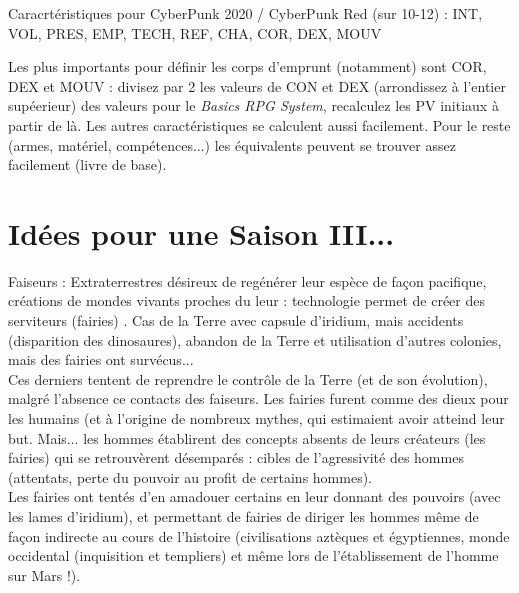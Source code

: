 \documentclass[11pt,twoside,a4paper]{book}
\begin{document}
Caracrt{\'e}ristiques pour CyberPunk 2020 / CyberPunk Red (sur 10-12) : INT, VOL, PRES, EMP, TECH, REF, CHA, COR, DEX, MOUV

Les plus importants pour d{\'e}finir les corps d'emprunt (notamment) sont COR, DEX et MOUV : divisez par 2 les valeurs de CON et DEX (arrondissez {\`a} l'entier sup{\'e}erieur) des valeurs pour le \emph{Basics RPG System}, recalculez les PV initiaux {\`a} partir de l{\`a}. Les autres caract{\'e}ristiques se calculent aussi facilement. Pour le reste (armes, mat{\'e}riel, comp{\'e}tences...) les {\'e}quivalents peuvent se trouver assez facilement (livre de base). 

\clearpage

\section*{Id{\'e}es pour une Saison III...}

Faiseurs : Extraterrestres d{\'e}sireux de reg{\'e}n{\'e}rer leur esp{\`e}ce de fa\c{c}on pacifique, cr{\'e}ations de mondes vivants proches du leur : technologie permet de cr{\'e}er des serviteurs (fairies) . Cas de la Terre avec capsule d'iridium, mais accidents (disparition des dinosaures), abandon de la Terre et utilisation d'autres colonies, mais des fairies ont surv{\'e}cus... ~\\

Ces derniers tentent de reprendre le contr{\^o}le de la Terre (et de son {\'e}volution), malgr{\'e} l'absence ce contacts des faiseurs. Les fairies furent comme des dieux pour les humains (et {\`a} l'origine de nombreux mythes, qui estimaient avoir atteind leur but. Mais... les hommes {\'e}tablirent des concepts absents de leurs cr{\'e}ateurs (les fairies) qui se retrouv{\`e}rent d{\'e}sempar{\'e}s : cibles de l'agressivit{\'e} des hommes (attentats, perte du pouvoir au profit de certains hommes). ~\\

Les fairies ont tent{\'e}s d'en amadouer certains en leur donnant des pouvoirs (avec les lames d'iridium), et permettant de fairies de diriger les hommes m{\^e}me de fa\c{c}on indirecte au cours de l'histoire (civilisations azt{\`e}ques et {\'e}gyptiennes, monde occidental (inquisition et templiers) et m{\^e}me lors de l'{\'e}tablissement de l'homme sur Mars !). ~\\
\end{document}
